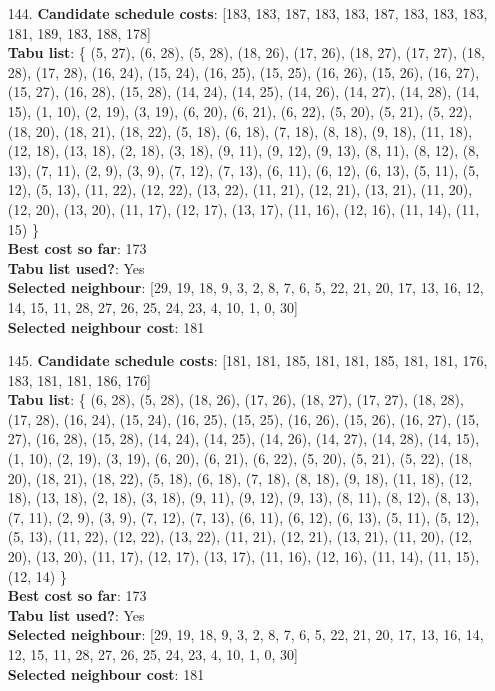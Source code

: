 \documentclass[fleqn]{article}
\begin{document}
\begin{itemize}
    \item[144.] \textbf{Candidate schedule costs}: [183, 183, 187, 183, 183, 187, 183, 183, 183, 181, 189, 183, 188, 178] \\
    \textbf{Tabu list}: \{ (5, 27), (6, 28), (5, 28), (18, 26), (17, 26), (18, 27), (17, 27), (18, 28), (17, 28), (16, 24), (15, 24), (16, 25), (15, 25), (16, 26), (15, 26), (16, 27), (15, 27), (16, 28), (15, 28), (14, 24), (14, 25), (14, 26), (14, 27), (14, 28), (14, 15), (1, 10), (2, 19), (3, 19), (6, 20), (6, 21), (6, 22), (5, 20), (5, 21), (5, 22), (18, 20), (18, 21), (18, 22), (5, 18), (6, 18), (7, 18), (8, 18), (9, 18), (11, 18), (12, 18), (13, 18), (2, 18), (3, 18), (9, 11), (9, 12), (9, 13), (8, 11), (8, 12), (8, 13), (7, 11), (2, 9), (3, 9), (7, 12), (7, 13), (6, 11), (6, 12), (6, 13), (5, 11), (5, 12), (5, 13), (11, 22), (12, 22), (13, 22), (11, 21), (12, 21), (13, 21), (11, 20), (12, 20), (13, 20), (11, 17), (12, 17), (13, 17), (11, 16), (12, 16), (11, 14), (11, 15) \} \\
    \textbf{Best cost so far}: 173 \\
    \textbf{Tabu list used?}: Yes \\
    \textbf{Selected neighbour}: [29, 19, 18, 9, 3, 2, 8, 7, 6, 5, 22, 21, 20, 17, 13, 16, 12, 14, 15, 11, 28, 27, 26, 25, 24, 23, 4, 10, 1, 0, 30] \\
    \textbf{Selected neighbour cost}: 181
      

    \item[145.] \textbf{Candidate schedule costs}: [181, 181, 185, 181, 181, 185, 181, 181, 176, 183, 181, 181, 186, 176] \\
    \textbf{Tabu list}: \{ (6, 28), (5, 28), (18, 26), (17, 26), (18, 27), (17, 27), (18, 28), (17, 28), (16, 24), (15, 24), (16, 25), (15, 25), (16, 26), (15, 26), (16, 27), (15, 27), (16, 28), (15, 28), (14, 24), (14, 25), (14, 26), (14, 27), (14, 28), (14, 15), (1, 10), (2, 19), (3, 19), (6, 20), (6, 21), (6, 22), (5, 20), (5, 21), (5, 22), (18, 20), (18, 21), (18, 22), (5, 18), (6, 18), (7, 18), (8, 18), (9, 18), (11, 18), (12, 18), (13, 18), (2, 18), (3, 18), (9, 11), (9, 12), (9, 13), (8, 11), (8, 12), (8, 13), (7, 11), (2, 9), (3, 9), (7, 12), (7, 13), (6, 11), (6, 12), (6, 13), (5, 11), (5, 12), (5, 13), (11, 22), (12, 22), (13, 22), (11, 21), (12, 21), (13, 21), (11, 20), (12, 20), (13, 20), (11, 17), (12, 17), (13, 17), (11, 16), (12, 16), (11, 14), (11, 15), (12, 14) \} \\
    \textbf{Best cost so far}: 173 \\
    \textbf{Tabu list used?}: Yes \\
    \textbf{Selected neighbour}: [29, 19, 18, 9, 3, 2, 8, 7, 6, 5, 22, 21, 20, 17, 13, 16, 14, 12, 15, 11, 28, 27, 26, 25, 24, 23, 4, 10, 1, 0, 30] \\
    \textbf{Selected neighbour cost}: 181
      


\end{itemize}
\end{document}
